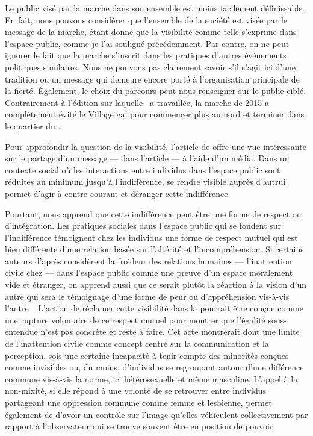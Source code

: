 Le public visé par la marche dans son ensemble est moins facilement définissable. 
En fait, nous pouvons considérer que l'ensemble de la société est visée par le message de la marche, étant donné que la visibilité comme telle s'exprime dans l'espace public, comme je l'ai souligné précédemment. 
Par contre, on ne peut ignorer le fait que la marche s'inscrit dans les pratiques d'autres événements politiques similaires. 
Nous ne pouvons pas clairement savoir s'il s'agit ici d'une tradition ou un message qui demeure encore porté à l'organisation principale de la fierté. 
Également, le choix du parcours peut nous renseigner sur le public ciblé. 
Contrairement à l'édition sur laquelle~\citet{Podmore2015a} a travaillée, la marche de 2015 a complètement évité le Village gai pour commencer plus au nord et terminer dans le quartier du .

Pour approfondir la question de la visibilité, l'article de \citet{Frosh2006}  offre une vue intéressante sur le partage d'un message ---  dans l'article --- à l'aide d'un média. 
Dans un contexte social où les interactions entre individus dans l'espace public sont réduites au minimum jusqu'à l'indifférence, se rendre visible auprès d'autrui permet d'agir à contre-courant et déranger cette indifférence. 

Pourtant, \citeauthor{Frosh2006} nous apprend que cette indifférence peut être une forme de respect ou d'intégration. 
Les pratiques sociales dans l'espace public qui se fondent sur l'indifférence témoignent chez les individus une forme de respect mutuel qui est bien différente d'une relation basée sur l'altérité et l'incompréhension. 
Si certains auteurs d'après \citeauthor{Frosh2006} considèrent la froideur des relations humaines --- l'inattention civile chez \citeauthor{Goffman1956} --- dans l'espace public comme une preuve d'un espace moralement vide et étranger, on apprend aussi que ce serait plutôt la réaction à la vision d'un autre qui sera le témoignage d'une forme de peur ou d'appréhension vis-à-vis l'autre~\citep[279--280]{Frosh2006}. 
L'action de réclamer cette visibilité dans la \dm{} pourrait être conçue comme une rupture volontaire de ce respect mutuel pour montrer que l'égalité sous-entendue n'est pas concrète et reste à faire. 
Cet acte montrerait dont une limite de l'inattention civile comme concept centré sur la communication et la perception, sois une certaine incapacité à tenir compte des minorités conçues comme invisibles ou, du moins, d'individus se regroupant autour d'une différence commune vis-à-vis la norme, ici hétérosexuelle et même masculine. 
L'appel à la non-mixité, si elle répond à une volonté de se retrouver entre individus partageant une oppression commune comme femme et lesbienne, permet également de d'avoir un contrôle sur l'image qu'elles véhiculent collectivement par rapport à l'observateur qui se trouve souvent être en position de pouvoir.

